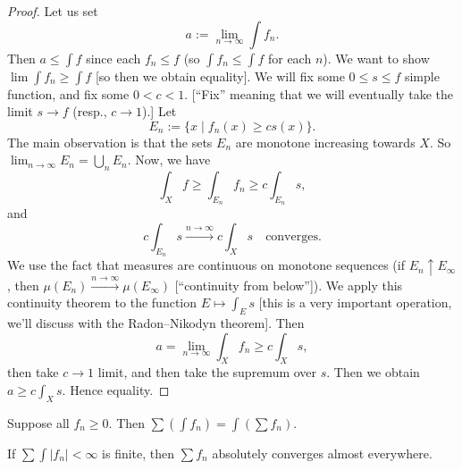 \begin{proof}
Let us set
\begin{equation}
a := \lim_{n\to\infty}\int f_{n}.
\end{equation}
Then $a\leq\int f$ since each $f_{n}\leq f$ (so $\int f_{n}\leq\int f$
for each $n$). We want to show $\lim\int f_{n}\geq\int f$ [so then we
obtain equality].
We will fix some $0\leq s\leq f$ simple function, and fix some $0<c<1$.
[``Fix'' meaning that we will eventually take the limit $s\to f$
  (resp., $c\to 1$).]
Let
\begin{equation}
E_{n}:=\{x\mid f_{n}(x)\geq cs(x)\}.
\end{equation}
The main observation is that the sets $E_{n}$ are monotone increasing towards
$X$. So $\lim_{n\to\infty}E_{n}=\bigcup_{n}E_{n}$. Now, we have
\begin{equation}
\int_{X}f\geq\int_{E_{n}}f_{n}\geq c\int_{E_{n}}s,
\end{equation}
and
\begin{equation}
c\int_{E_{n}}s\xrightarrow{n\to\infty}c\int_{X}s\quad\mbox{converges}.
\end{equation}
We use the fact that measures are continuous on monotone sequences (if
$E_{n}\uparrow E_{\infty}$, then $\mu(E_{n})\xrightarrow{n\to\infty}\mu(E_{\infty})$
[``continuity from below'']).
We apply this continuity theorem to the function $E\mapsto\int_{E}s$
[this is a very important operation, we'll discuss with the
  Radon--Nikodyn theorem]. Then
\begin{equation}
a=\lim_{n\to\infty}\int_{X}f_{n}\geq c\int_{X}s,
\end{equation}
then take $c\to1$ limit, and then take the supremum over $s$. Then we
obtain
$a\geq c\int_{X}s$. Hence equality.
\end{proof}

\begin{corollary}
Suppose all $f_{n}\geq0$. Then $\sum(\int f_{n})=\int(\sum f_{n})$.
\end{corollary}

\begin{corollary}
If $\sum\int|f_{n}|<\infty$ is finite, then $\sum f_{n}$ absolutely
converges almost everywhere.
\end{corollary}